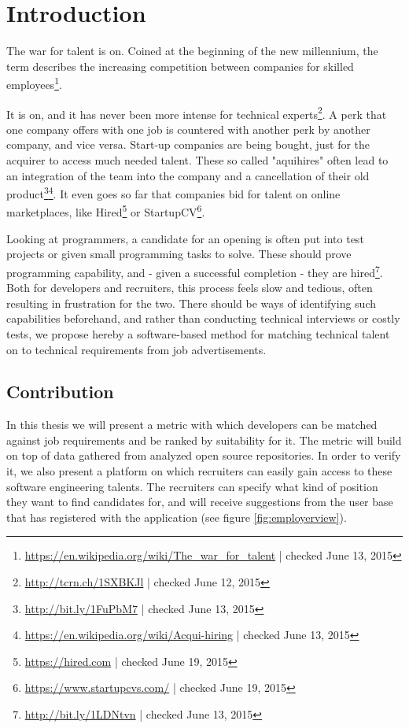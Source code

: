 \chapter{Introduction}\label{ch:introduction}
The war for talent is on. Coined at the beginning of the new millennium, the term describes the increasing competition between companies for skilled employees\footnote{\url{https://en.wikipedia.org/wiki/The_war_for_talent} | checked June 13, 2015}.

It is on, and it has never been more intense for technical experts\footnote{\url{http://tcrn.ch/1SXBKJl} | checked June 12, 2015}. A perk that one company offers with one job is countered with another perk by another company, and vice versa. Start-up companies are being bought, just for the acquirer to access much needed talent. These so called "aquihires" often lead to an integration of the team into the company and a cancellation of their old product\footnote{\url{http://bit.ly/1FuPbM7} | checked June 13, 2015}\footnote{\url{https://en.wikipedia.org/wiki/Acqui-hiring} | checked June 13, 2015}. It even goes so far that companies bid for talent on online marketplaces, like Hired\footnote{\url{https://hired.com} | checked June 19, 2015} or StartupCV\footnote{\url{https://www.startupcvs.com/} | checked June 19, 2015}.
\newline

Looking at programmers, a candidate for an opening is often put into test projects or given small programming tasks to solve. These should prove programming capability, and - given a successful completion - they are hired\footnote{\url{http://bit.ly/1LDNtvn} | checked June 13, 2015}. Both for developers and recruiters, this process feels slow and tedious, often resulting in frustration for the two. There should be ways of identifying such capabilities beforehand, and rather than conducting technical interviews or costly tests, we propose hereby a software-based method for matching technical talent on to technical requirements from job advertisements.

\section{Contribution}
In this thesis we will present a metric with which developers can be matched against job requirements and be ranked by suitability for it. The metric will build on top of data gathered from analyzed open source repositories. In order to verify it, we also present a platform on which recruiters can easily gain access to these software engineering talents. The recruiters can specify what kind of position they want to find candidates for, and will receive suggestions from the user base that has registered with the application (see figure \ref{fig:employerview}).

